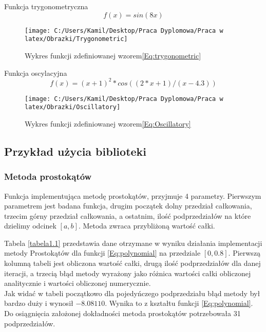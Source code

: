 \documentclass[12pt,twoside]{article}
\begin{document}
Funkcja trygonometryczna
\begin{equation}
f(x) = sin(8x)
\label{Eq:trygonometric}
\end{equation}

\begin{figure}[h]
\texttt{[image: C:/Users/Kamil/Desktop/Praca Dyplomowa/Praca w latex/Obrazki/Trygonometric]}
\caption{Wykres funkcji zdefiniowanej wzorem\eqref{Eq:trygonometric}}
\end{figure}

Funkcja oscylacyjna
\begin{equation}
f(x) = (x+1)^2*cos((2*x+1)/(x-4.3))
\label{Eq:Oscillatory}
\end{equation}

\begin{figure}[h]
\texttt{[image: C:/Users/Kamil/Desktop/Praca Dyplomowa/Praca w latex/Obrazki/Oscillatory]}
\caption{Wykres funkcji zdefiniowanej wzorem\eqref{Eq:Oscillatory}}
\end{figure}

\subsection{Przykład użycia biblioteki}

\subsubsection{Metoda prostokątów}
	Funkcja implementująca metodę prostokątów, przyjmuje 4 parametry. Pierwszym parametrem jest badana funkcja, drugim początek dolny przedział całkowania, trzecim górny przedział całkowania, a ostatnim, ilość podprzedziałów na które dzielimy odcinek $[a,b]$. Metoda zwraca przybliżoną wartość całki.
	
	Tabela \eqref{tabela1.1} przedstawia dane otrzymane w wyniku działania implementacji metody Prostokątów dla funkcji \eqref{Eq:polynomial} na przedziale $[0,0.8]$.
	Pierwszą kolumną tabeli jest obliczona wartość całki, drugą ilość podprzedziałów dla danej iteracji, a trzecią błąd metody wyrażony jako różnica wartości całki obliczonej 			analitycznie i wartości obliczonej numerycznie.\\
	Jak widać w tabeli początkowo dla pojedyńczego podprzedziału błąd metody był bardzo duży i wynosił $-8.08110$. Wynika to z kształtu funkcji \eqref{Eq:polynomial}.\\
	Do osiągnięcia założonej dokładności metoda prostokątów potrzebowała 31 podprzedziałów.
	
\end{document}
